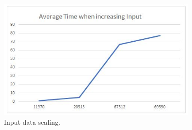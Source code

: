 \begin{figure}[ht]
\includegraphics[width=10cm]{Thesis/figures/figure5.JPG}
\caption{Input data scaling.}
\label{fig:graph}
\end{figure}



